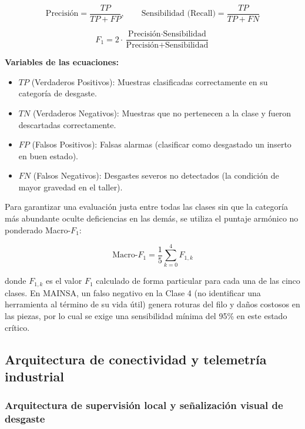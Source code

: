 \begin{equation}
\text{Precisión} = \frac{TP}{TP + FP}, \qquad \text{Sensibilidad (Recall)} = \frac{TP}{TP + FN}
\label{eq:precision_recall}
\end{equation}

\begin{equation}
F_1 = 2 \cdot \frac{\text{Precisión} \cdot \text{Sensibilidad}}{\text{Precisión} + \text{Sensibilidad}}
\label{eq:f1_score}
\end{equation}

\noindent\textbf{Variables de las ecuaciones:}
\begin{itemize}
    \item $TP$ (Verdaderos Positivos): Muestras clasificadas correctamente en su categoría de desgaste.
    \item $TN$ (Verdaderos Negativos): Muestras que no pertenecen a la clase y fueron descartadas correctamente.
    \item $FP$ (Falsos Positivos): Falsas alarmas (clasificar como desgastado un inserto en buen estado).
    \item $FN$ (Falsos Negativos): Desgastes severos no detectados (la condición de mayor gravedad en el taller).
\end{itemize}

Para garantizar una evaluación justa entre todas las clases sin que la categoría más abundante oculte deficiencias en las demás, se utiliza el puntaje armónico no ponderado Macro-$F_1$:

\begin{equation}
\text{Macro-}F_1 = \frac{1}{5} \sum_{k=0}^{4} F_{1,k}
\label{eq:macro_f1}
\end{equation}

donde $F_{1,k}$ es el valor $F_1$ calculado de forma particular para cada una de las cinco clases. En MAINSA, un falso negativo en la Clase 4 (no identificar una herramienta al término de su vida útil) genera roturas del filo y daños costosos en las piezas, por lo cual se exige una sensibilidad mínima del 95\% en este estado crítico.


\subsection{Arquitectura de conectividad y telemetría industrial}
\subsubsection{Arquitectura de supervisión local y señalización visual de desgaste}

